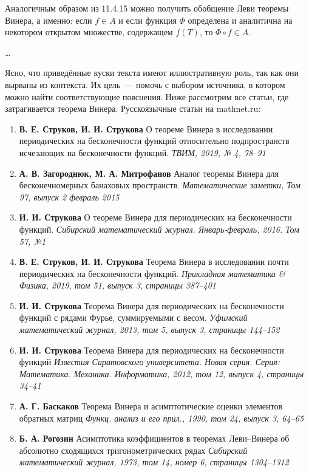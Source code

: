 \documentclass[12pt]{extarticle}
\theoremstyle{definition}
\begin{document}
\begin{enumerate}
		Аналогичным образом из 11.4.15 можно получить обобщение Леви теоремы Винера, а именно: если $f\in A$ и если функция $\Phi$ определена и аналитична на некотором открытом множестве, содержащем $f(T)$, то $\Phi\circ f\in A$.

		\dots
	\end{enumerate}

  	 Ясно, что приведённые куски текста имеют иллюстративную роль, так как они вырваны из контекста. Их цель~--- помочь с выбором источника, в котором можно найти соответствующие пояснения. Ниже рассмотрим все статьи, где затрагивается теорема Винера. Русскоязычные статьи на mathnet.ru:
  	\begin{enumerate}
  		\item \textbf{В. Е. Струков, И. И. Струкова} О теореме Винера в исследовании периодических на бесконечности функций относительно подпространств исчезающих на бесконечности функций. \textit{ТВИМ, 2019, № 4, 78–91}
		\item \textbf{А. В. Загороднюк, М. А. Митрофанов} Аналог теоремы Винера для бесконечномерных банаховых пространств. \textit{Математические заметки, Том 97, выпуск 2 февраль 2015}
		\item \textbf{И. И. Струкова} О теореме Винера для периодических на бесконечности функций. \textit{Сибирский математический журнал. Январь-февраль, 2016. Том 57, №1}
		\item \textbf{В. Е. Струков, И. И. Струкова} Теорема Винера в исследовании почти периодических на бесконечности функций. \textit{Прикладная математика \& Физика, 2019, том 51, выпуск 3, страницы 387–401}
		\item \textbf{И. И. Струкова} Теорема Винера для периодических на бесконечности функций с рядами Фурье, суммируемыми с весом. \textit{Уфимский математический журнал, 2013, том 5, выпуск 3, страницы 144–152}
		\item \textbf{И. И. Струкова} Теорема Винера для периодических на бесконечности функций \textit{Известия Саратовского университета. Новая серия. Серия: Математика. Механика. Информатика, 2012, том 12, выпуск 4, страницы 34–41}
		\item \textbf{А. Г. Баскаков} Теорема Винера и асимптотические оценки элементов обратных матриц \textit{Функц.
			анализ и его прил., 1990, том 24, выпуск 3, 64–65}
		\item \textbf{Б. А. Рогозин} Асимптотика коэффициентов в теоремах Леви–Винера об абсолютно сходящихся тригонометрических рядах \textit{Сибирский математический журнал, 1973, том 14, номер 6, страницы 1304–1312}\\

\end{enumerate}
\end{document}
